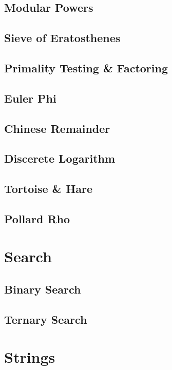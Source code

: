 \documentclass[twocolumn]{article}
\begin{document}
		\subsection{Modular Powers}
			
		\subsection{Sieve of Eratosthenes}
			
		\subsection{Primality Testing \& Factoring}
			
		\subsection{Euler Phi}
			
		\subsection{Chinese Remainder}
			
		\subsection{Discerete Logarithm}
			
		\subsection{Tortoise \& Hare}
			
		\subsection{Pollard Rho}
	\section{Search}
		\subsection{Binary Search}
			
		\subsection{Ternary Search}
			
	\section{Strings}
\end{document}
